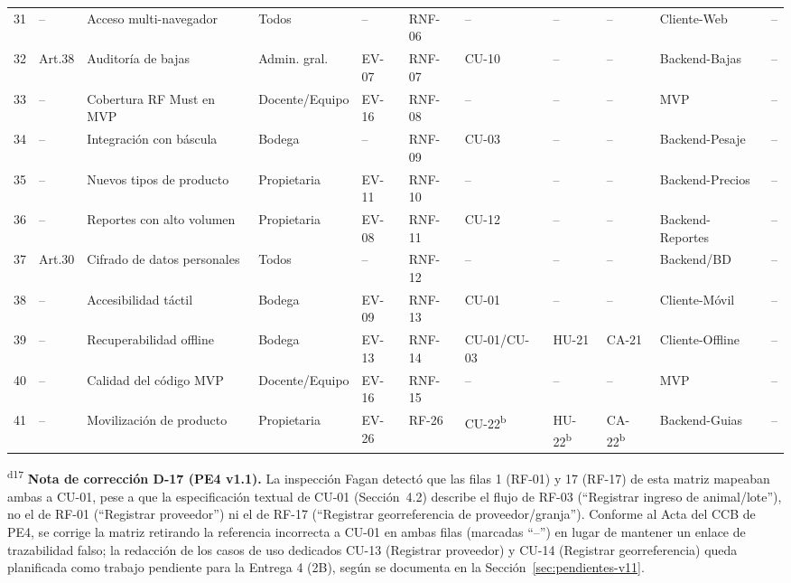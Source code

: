 \documentclass[11pt,a4paper]{article}
\begin{document}
\begin{longtable}{|p{0.5cm}|p{1.5cm}|p{2.2cm}|p{1.5cm}|p{0.8cm}|p{0.8cm}|p{0.8cm}|p{0.8cm}|p{0.8cm}|p{1.3cm}|p{1cm}|}
31 & -- & Acceso multi-navegador & Todos & -- & RNF-06 & -- & -- & -- & Cliente-Web & -- \\
32 & Art.38 & Auditoría de bajas & Admin. gral. & EV-07 & RNF-07 & CU-10 & -- & -- & Backend-Bajas & -- \\
33 & -- & Cobertura RF Must en MVP & Docente/Equipo & EV-16 & RNF-08 & -- & -- & -- & MVP & -- \\
34 & -- & Integración con báscula & Bodega & -- & RNF-09 & CU-03 & -- & -- & Backend-Pesaje & -- \\
35 & -- & Nuevos tipos de producto & Propietaria & EV-11 & RNF-10 & -- & -- & -- & Backend-Precios & -- \\
36 & -- & Reportes con alto volumen & Propietaria & EV-08 & RNF-11 & CU-12 & -- & -- & Backend-Reportes & -- \\
37 & Art.30 & Cifrado de datos personales & Todos & -- & RNF-12 & -- & -- & -- & Backend/BD & -- \\
38 & -- & Accesibilidad táctil & Bodega & EV-09 & RNF-13 & CU-01 & -- & -- & Cliente-Móvil & -- \\
39 & -- & Recuperabilidad offline & Bodega & EV-13 & RNF-14 & CU-01/CU-03 & HU-21 & CA-21 & Cliente-Offline & -- \\
40 & -- & Calidad del código MVP & Docente/Equipo & EV-16 & RNF-15 & -- & -- & -- & MVP & -- \\
\hline
41 & -- & Movilización de producto & Propietaria & EV-26 & RF-26 & CU-22\textsuperscript{b} & HU-22\textsuperscript{b} & CA-22\textsuperscript{b} & Backend-Guias & -- \\
\hline
\end{longtable}
\normalsize

\footnotesize
\textsuperscript{d17} \textbf{Nota de corrección D-17 (PE4 v1.1).} La inspección Fagan detectó que las filas 1 (RF-01) y 17 (RF-17) de esta matriz mapeaban ambas a CU-01, pese a que la especificación textual de CU-01 (Sección~4.2) describe el flujo de RF-03 (``Registrar ingreso de animal/lote''), no el de RF-01 (``Registrar proveedor'') ni el de RF-17 (``Registrar georreferencia de proveedor/granja''). Conforme al Acta del CCB de PE4, se corrige la matriz retirando la referencia incorrecta a CU-01 en ambas filas (marcadas ``--'') en lugar de mantener un enlace de trazabilidad falso; la redacción de los casos de uso dedicados CU-13 (Registrar proveedor) y CU-14 (Registrar georreferencia) queda planificada como trabajo pendiente para la Entrega 4 (2B), según se documenta en la Sección~\ref{sec:pendientes-v11}.
\end{document}
